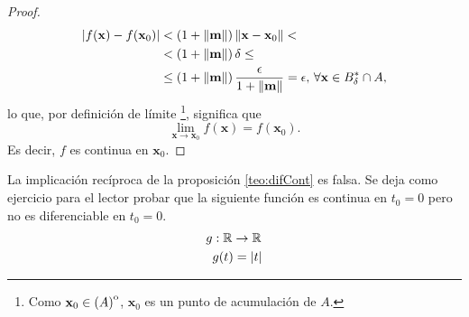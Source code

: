 \begin{proof}
\begin{align*}
 \abs{ f(\mathbf{x}) - f(\mathbf{x}_0) } &< \left( 1 + \norm{\mathbf{m}} \right) \norm{\mathbf{x} - \mathbf{x}_0} < \\
                       &<   \left( 1 + \norm{\mathbf{m}} \right) \delta \le \\
                       &\le \left( 1 + \norm{\mathbf{m}} \right) \frac{\epsilon}{1 + \norm{\mathbf{m}}} = \epsilon, 
                       \, \forall \mathbf{x} \in B^*_{\delta} \cap A,
\end{align*}
lo que, por definici\'on de l\'imite \footnote{Como $\mathbf{x}_0 \in {\kern0pt(A)}^{\mathrm{o}}$, $\mathbf{x}_0$ es un punto de acumulaci\'on de $A$. }, significa que 
\[
 \lim_{\mathbf{x} \to \mathbf{x}_0}f(\mathbf{x}) = f(\mathbf{x}_0).
\]
Es decir, $f$ es continua en $\mathbf{x}_0$.
\end{proof}




\begin{obs} La implicaci\'on rec\'iproca de la proposici\'on \eqref{teo:difCont} es falsa.  Se deja como ejercicio para el lector probar que la siguiente funci\'on es continua en $t_0 = 0$ pero no es diferenciable en $t_0 = 0$.
  \begin{align*}
      g & :\mathbb{R} \to \mathbb{R} \\
        & g(t) = \abs{t}
 \end{align*}
\end{obs}










